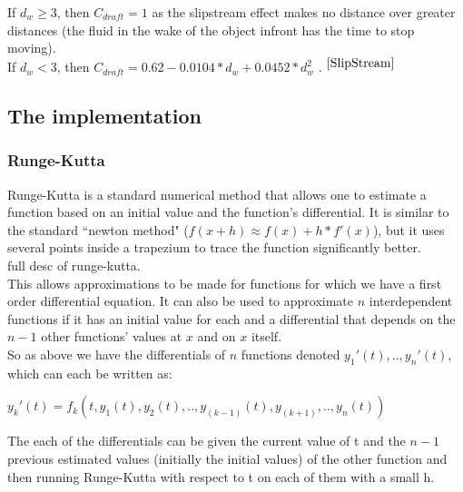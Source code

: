 \documentclass[10pt, a4paper]{report}
\begin{document}
If $d_w \ge 3$, then $C_{draft} = 1$ as the slipstream effect makes no distance over greater distances (the fluid in the wake of the object infront has the time to stop moving). \\
If $d_w < 3$, then $C_{draft} = 0.62 - 0.0104*d_w + 0.0452*d_w^2$ . $^{\cite{SlipStream}}$

\subsection{The implementation}

\subsubsection{Runge-Kutta}


Runge-Kutta is a standard numerical method that allows one to estimate a function based on an initial value and the function's differential. It is similar to the standard ``newton method" ($f(x + h) \approx f(x) + h*f'(x)$), but it uses several points inside a trapezium to trace the function significantly better. \\ %
\newline
full desc of runge-kutta.\\
\newline
This allows approximations to be made for functions for which we have a first order differential equation. It can also be used to approximate $n$ interdependent functions if it has an initial value for each and a differential that depends on the $n - 1$ other functions' values at $x$ and on $x$ itself.\\

So as above we have the differentials of $n$ functions denoted $y_1'(t),..,y_n'(t)$, which can each be written as: \\

{\centering $y_k'(t) = f_k(t,y_1(t),y_2(t),..,y_{(k-1)}(t),y_{(k+1)},..,y_n(t))$ \newline \par}

The each of the differentials can be given the current value of t and the $n - 1$ previous estimated values (initially the initial values) of the other function and then running Runge-Kutta with respect to t on each of them with a small h. \newline \par
\end{document}
